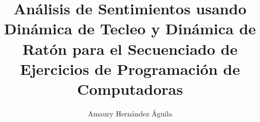 % 
% 
%
%
%
%
%
%
%
% 
% 


\title{Análisis de Sentimientos usando Dinámica de Tecleo y Dinámica
  de Ratón para el Secuenciado de Ejercicios de Programación de Computadoras}

\author{Amaury Hernández Águila}


